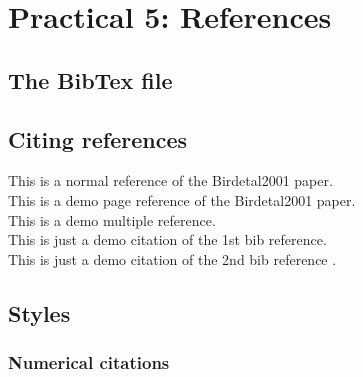 \documentclass[a4paper,12pt]{report}
\begin{document}
\newpage

\chapter*{Practical 5: References}

\section{The BibTex file}

\section{Citing references}

\cite{Birdetal2001} This is a normal reference of the Birdetal2001 paper. \\
\cite[p. 215]{Birdetal2001} This is a demo page reference of the Birdetal2001 paper. \\
\cite{9654185, 9001082, w1, p1, p2, p3, p4, p5, p6} This is a demo multiple reference. \\
\cite{9654185} This is just a demo citation of the 1st bib reference. \\
This is just a demo citation of the 2nd bib reference \cite{9001082}. \\

\section{Styles}
\subsection{Numerical citations}



\end{document}
